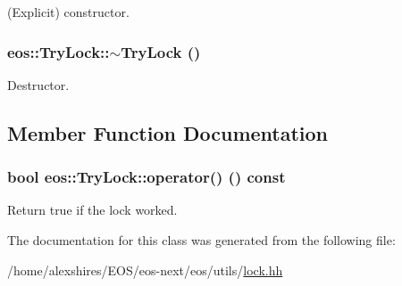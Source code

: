 (Explicit) constructor. \hypertarget{classeos_1_1TryLock_a152750e617dbda392da45a234dd3c41f}{
\subsubsection[{$\sim$TryLock}]{\setlength{\rightskip}{0pt plus 5cm}eos::TryLock::$\sim$TryLock ()}}
\label{classeos_1_1TryLock_a152750e617dbda392da45a234dd3c41f}


Destructor. 

\subsection{Member Function Documentation}
\hypertarget{classeos_1_1TryLock_ac0b6b930a21cf09894d97883d352dee7}{
\subsubsection[{operator()}]{\setlength{\rightskip}{0pt plus 5cm}bool eos::TryLock::operator() () const}}
\label{classeos_1_1TryLock_ac0b6b930a21cf09894d97883d352dee7}


Return true if the lock worked. 

The documentation for this class was generated from the following file:\begin{DoxyCompactItemize}
\item 
/home/alexshires/EOS/eos-\/next/eos/utils/\hyperlink{lock_8hh}{lock.hh}\end{DoxyCompactItemize}
